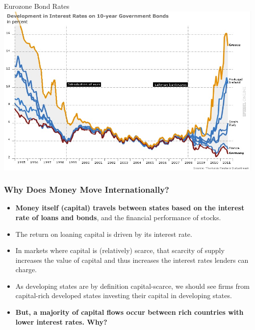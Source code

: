 \documentclass[handout]{beamer}
\begin{document}
\begin{frame}{\LARGE Eurozone Bond Rates}
	\centering
	\includegraphics[width=\textwidth,height=0.8\textheight,keepaspectratio]{Eurozone rates.jpg}
\end{frame}



\begin{frame} 
	\frametitle{\LARGE{Why Does Money Move Internationally?}}
	\begin{itemize}

			\item \textbf{Money itself (capital) travels between states based on the interest rate of loans and bonds}, and the financial performance of stocks. \pause
			\item The return on loaning capital is driven by its interest rate. \pause
			\item In markets where capital is (relatively) scarce, that scarcity of supply increases the value of capital and thus increases the interest rates lenders can charge. \pause
			\item As developing states are by definition capital-scarce, we should see firms from capital-rich developed states investing their capital in developing states. \pause
			\item \textbf{But, a majority of capital flows occur between rich countries with lower interest rates. Why?}
		
	\end{itemize}
\end{frame}
\end{document}
